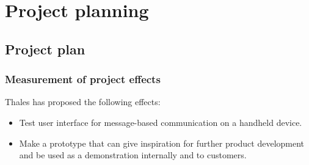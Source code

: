 \chapter{Project planning}

\section{Project plan}

\subsection{Measurement of project effects}

Thales has proposed the following effects:
\begin{itemize}
\item{}Test user interface for message-based communication on a handheld device.
\item{}Make a prototype that can give inspiration for further product development and be used as a demonstration internally and to customers.
\end{itemize}